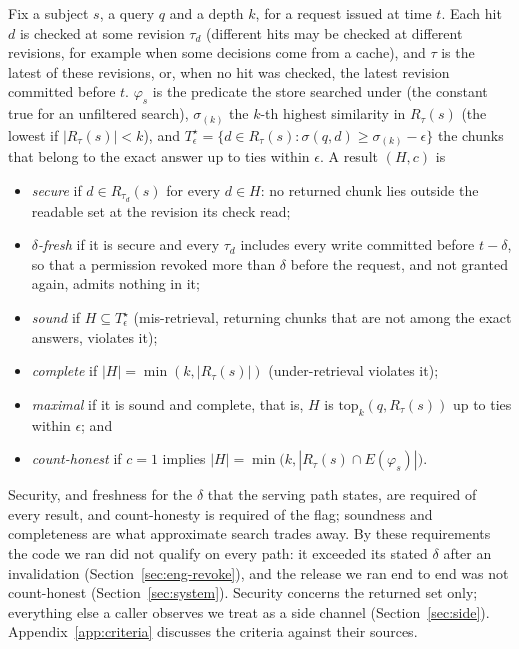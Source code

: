 \begin{definition}\label{def:criteria}
Fix a subject $s$, a query $q$ and a depth $k$, for a request issued at time $t$. Each hit $d$ is
checked at some revision $\tau_d$ (different hits may be checked at different revisions, for example
when some decisions come from a cache), and $\tau$ is the latest of these revisions, or, when no hit
was checked, the latest revision committed before $t$. $\varphi_s$ is
the predicate the store searched under (the constant true for an unfiltered search), $\sigma_{(k)}$
the $k$-th highest similarity in $R_\tau(s)$ (the lowest if $|R_\tau(s)| < k$), and
$T^\star_\epsilon = \{d \in R_\tau(s) : \sigma(q,d) \ge \sigma_{(k)} - \epsilon\}$ the chunks that
belong to the exact answer up to ties within $\epsilon$. A result $(H,c)$ is
\begin{itemize}
  \item \emph{secure} if $d \in R_{\tau_d}(s)$ for every $d \in H$: no returned chunk lies outside
        the readable set at the revision its check read;
  \item \emph{$\delta$-fresh} if it is secure and every $\tau_d$ includes every write committed before
        $t - \delta$, so that a permission revoked more than $\delta$ before the request, and not
        granted again, admits nothing in it;
  \item \emph{sound} if $H \subseteq T^\star_\epsilon$ (mis-retrieval, returning chunks that are not
        among the exact answers, violates it);
  \item \emph{complete} if $|H| = \min(k, |R_\tau(s)|)$ (under-retrieval violates it);
  \item \emph{maximal} if it is sound and complete, that is, $H$ is $\mathrm{top}_k(q, R_\tau(s))$
        up to ties within $\epsilon$; and
  \item \emph{count-honest} if $c = 1$ implies $|H| = \min\bigl(k, |R_\tau(s) \cap E(\varphi_s)|\bigr)$.
\end{itemize}
\end{definition}

Security, and freshness for the $\delta$ that the serving path states, are required of every result,
and count-honesty is required of the flag; soundness and completeness are what approximate search trades away.
By these requirements the code we ran did not qualify on every path: it exceeded its stated $\delta$ after an
invalidation (Section~\ref{sec:eng-revoke}), and the release we ran end to end was not count-honest (Section~\ref{sec:system}).
Security concerns the returned set only; everything else a caller observes we treat
as a side channel (Section~\ref{sec:side}). Appendix~\ref{app:criteria} discusses the criteria against their
sources.

